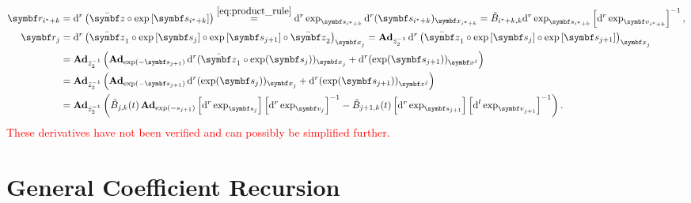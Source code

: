 \begin{equation}
  \begin{aligned}
    \symbf r_{i^* + k}
     & = \mathrm{d}^r \left( \bar \z \circ \exp \left[ \symbf s_{i^* + k} \right] \right)
    \overset{\eqref{eq:product_rule}}= \mathrm{d}^r \exp_{\symbf s_{i^*+k}} \mathrm{d}^r (\symbf s_{i^*+k})_{\x_{i^* + k}} =  \tilde B_{i^* + k, k} \mathrm{d}^r \exp_{\symbf s_{i^*+k}} \left[ \mathrm{d}^r \exp_{\bv_{i^*+k}} \right]^{-1},                                                                      \\
    \symbf r_{j}
     & = \mathrm{d}^r \left( \bar \z_1 \circ \exp \left[ \symbf s_{j} \right]\circ \exp \left[ \symbf s_{j+1} \right] \circ \bar \z_2 \right)_{\x_j}
    = \bAd_{\bar z_2^{-1}} \mathrm{d}^r \left( \bar \z_1 \circ \exp \left[ \symbf s_{j} \right]\circ \exp \left[ \symbf s_{j+1} \right] \right)_{\x_j}                                                                                                                                                             \\
     & = \bAd_{\bar z_2^{-1}} \left( \bAd_{\exp(-\symbf s_{j+1})} \mathrm{d}^r (\bar \z_1 \circ \exp(\symbf s_j))_{\x_j} + \mathrm{d}^r (\exp(\symbf s_{j+1}))_{\x^j}  \right)                                                                                                                                     \\
     & = \bAd_{\bar z_2^{-1}} \left( \bAd_{\exp(-\symbf s_{j+1})} \mathrm{d}^r (\exp(\symbf s_j))_{\x_j} + \mathrm{d}^r (\exp(\symbf s_{j+1}))_{\x^j}  \right)                                                                                                                                                     \\
     & = \bAd_{\bar z_2^{-1}} \left( \tilde B_{j, k}(t) \bAd_{\exp(-s_{j+1})} \left[ \mathrm{d}^r \exp_{\symbf s_j} \right] \left[ \mathrm{d}^r \exp_{\symbf v_j} \right]^{-1} - \tilde B_{j+1, k}(t) \left[ \mathrm{d}^r \exp_{\symbf s_{j+1}} \right] \left[ \mathrm{d}^l \exp_{\bv_{j+1}} \right]^{-1} \right).
  \end{aligned}
\end{equation}
\textcolor{red}{These derivatives have not been verified and can possibly be simplified further.}

\section{General Coefficient Recursion}

